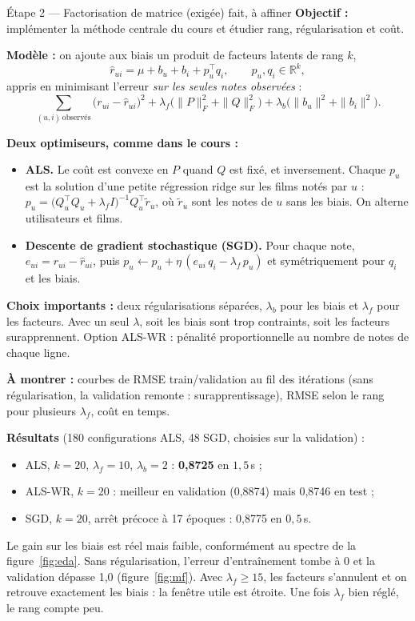 \documentclass[11pt,a4paper]{article}
\newcommand{\R}{\mathbb{R}}
\newcommand{\rhat}{\hat r}
\begin{document}
\begin{etape}{Étape 2 --- Factorisation de matrice (exigée) \hfill \textcolor{ok}{fait, à affiner}}
\textbf{Objectif :} implémenter la méthode centrale du cours et étudier rang,
régularisation et coût.

\textbf{Modèle :} on ajoute aux biais un produit de facteurs latents de rang $k$,
\[
  \rhat_{ui} = \mu + b_u + b_i + p_u^\top q_i, \qquad p_u, q_i \in \R^k,
\]
appris en minimisant l'erreur \emph{sur les seules notes observées} :
\[
  \sum_{(u,i)\,\text{observés}} \bigl(r_{ui} - \rhat_{ui}\bigr)^2
  + \lambda_f \bigl(\|P\|_F^2 + \|Q\|_F^2\bigr)
  + \lambda_b \bigl(\|b_u\|^2 + \|b_i\|^2\bigr).
\]

\textbf{Deux optimiseurs, comme dans le cours :}
\begin{itemize}
  \item \textbf{ALS.} Le coût est convexe en $P$ quand $Q$ est fixé, et
        inversement. Chaque $p_u$ est la solution d'une petite régression ridge
        sur les films notés par $u$ :
        $p_u = \bigl(Q_u^\top Q_u + \lambda_f I\bigr)^{-1} Q_u^\top \tilde r_u$,
        où $\tilde r_u$ sont les notes de $u$ sans les biais. On alterne
        utilisateurs et films.
  \item \textbf{Descente de gradient stochastique (SGD).} Pour chaque note,
        $e_{ui} = r_{ui} - \rhat_{ui}$, puis
        $p_u \leftarrow p_u + \eta\,(e_{ui}\, q_i - \lambda_f\, p_u)$ et
        symétriquement pour $q_i$ et les biais.
\end{itemize}

\textbf{Choix importants :} deux régularisations séparées, $\lambda_b$ pour les
biais et $\lambda_f$ pour les facteurs. Avec un seul $\lambda$, soit les biais
sont trop contraints, soit les facteurs surapprennent. Option ALS-WR : pénalité
proportionnelle au nombre de notes de chaque ligne.

\textbf{À montrer :} courbes de RMSE train/validation au fil des itérations
(sans régularisation, la validation remonte : surapprentissage), RMSE selon le
rang pour plusieurs $\lambda_f$, coût en temps.

\textbf{Résultats} (180 configurations ALS, 48 SGD, choisies sur la validation) :
\begin{itemize}
  \item ALS, $k = 20$, $\lambda_f = 10$, $\lambda_b = 2$ : \textbf{0,8725} en $1{,}5$\,s ;
  \item ALS-WR, $k = 20$ : meilleur en validation (0,8874) mais 0,8746 en test ;
  \item SGD, $k = 20$, arrêt précoce à 17 époques : 0,8775 en $0{,}5$\,s.
\end{itemize}
Le gain sur les biais est réel mais faible, conformément au spectre de la
figure~\ref{fig:eda}. Sans régularisation, l'erreur d'entraînement tombe à 0
et la validation dépasse 1,0 (figure~\ref{fig:mf}). Avec $\lambda_f \geq 15$,
les facteurs s'annulent et on retrouve exactement les biais : la fenêtre utile
est étroite. Une fois $\lambda_f$ bien réglé, le rang compte peu.


\end{etape}
\end{document}
